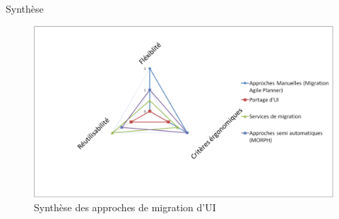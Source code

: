 \documentclass[11pt]{beamer}
\begin{document}
\begin{frame}[t]{Synthèse}
%
%
\begin{figure}[t]
\centering
\includegraphics[scale=.5]{./img/syntheseapproches}
\caption{Synthèse des approches de migration d'UI}
\label{fig:syntheseapproches}
\end{figure}

\end{frame}
\end{document}

